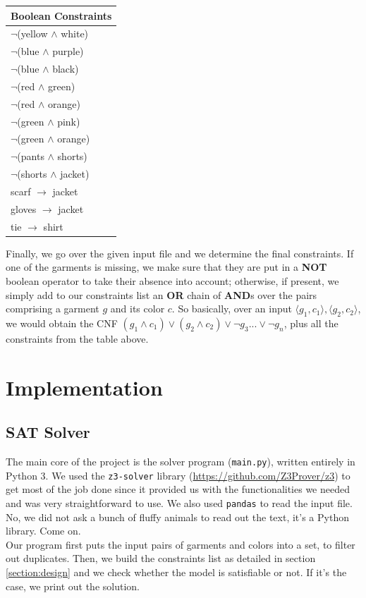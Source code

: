 \documentclass[12pt]{article}
\begin{document}
    \begin{center}
    \begin{tabular}{|l|}
    \hline
    Boolean Constraints \\
    \hline
    $\neg$(yellow $\wedge$ white) \\[0.1cm]
    $\neg$(blue $\wedge$ purple) \\[0.1cm]
    $\neg$(blue $\wedge$ black) \\[0.1cm]
    $\neg$(red $\wedge$ green) \\[0.1cm]
    $\neg$(red $\wedge$ orange) \\[0.1cm]
    $\neg$(green $\wedge$ pink) \\[0.1cm]
    $\neg$(green $\wedge$ orange) \\[0.1cm]
    $\neg$(pants $\wedge$ shorts) \\[0.1cm]
    $\neg$(shorts $\wedge$ jacket) \\[0.1cm]
    scarf $\rightarrow$ jacket \\[0.1cm]
    gloves $\rightarrow$ jacket \\[0.1cm]
    tie $\rightarrow$ shirt \\
    \hline
    \end{tabular}
    \end{center}

    Finally, we go over the given input file and we determine the final constraints. If one of the garments is missing, we make sure that they are put in a \textbf{NOT} boolean operator to take their absence into account; otherwise, if present, we simply add to our constraints list an \textbf{OR} chain of \textbf{AND}s over the pairs comprising a garment $g$ and its color $c$. So basically, over an input $\langle g_1, c_1 \rangle, \langle g_2, c_2 \rangle$, we would obtain the CNF $(g_1 \wedge c_1) \vee (g_2 \wedge c_2) \vee \neg g_3 ... \vee \neg g_n$, plus all the constraints from the table above.

    \newpage


\section{Implementation}

    \subsection{SAT Solver}
        The main core of the project is the solver program (\texttt{main.py}), written entirely in Python 3. 
        We used the \texttt{z3-solver} library (\url{https://github.com/Z3Prover/z3}) to get most of the job done since it provided us with the functionalities
        we needed and was very straightforward to use. We also used \texttt{pandas} to read the input file. No, we did not ask a bunch of fluffy animals to read out the text, it's a Python library. Come on.\\
        Our program first puts the input pairs of garments and colors into a set, to filter out duplicates. Then, we build the constraints list as detailed in section \ref{section:design} and we check whether the model is
        satisfiable or not. If it's the case, we print out the solution.
\end{document}

